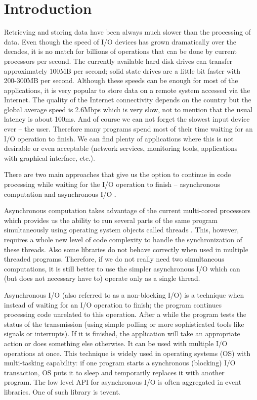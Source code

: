 \chapter{Introduction}

Retrieving and storing data have been always much slower than the processing of
data. Even though the speed of I/O devices has grown dramatically over the
decades, it is no match for billions of operations that can be done by current
processors per second. The currently available hard disk drives can transfer
approximately 100MB per second; solid state drives are a little bit faster with
200-300MB per second. Although these speeds can be enough for most of the
applications, it is very popular to store data on a remote system accessed via
the Internet. The quality of the Internet connectivity depends on the country
but the global average speed is 2.6Mbps \cite{StateOfTheInternet} which is very
slow, not to mention that the usual latency is about 100ms. And of course we
can not forget the slowest input device ever – the user. Therefore many programs
spend most of their time waiting for an I/O operation to finish. We can find
plenty of applications where this is not desirable or even acceptable (network
services, monitoring tools, applications with graphical interface, etc.).

There are two main approaches that give us the option to continue in code
processing while waiting for the I/O operation to finish – asynchronous
computation \cite{ParallelComputing} and asynchronous I/O \cite{AsynchronousIO}.

Asynchronous computation takes advantage of the current multi-cored processors
which provides us the ability to run several parts of the same program
simultaneously using operating system objects called threads \cite{Threads}.
This, however, requires a whole new level of code complexity to handle the
synchronization of these threads. Also some libraries do not behave correctly
when used in multiple threaded programs. Therefore, if we do not really need two
simultaneous computations, it is still better to use the simpler asynchronous
I/O which can (but does not necessary have to) operate only as a single thread.

Asynchronous I/O (also referred to as a non-blocking I/O) is a technique
when instead of waiting for an I/O operation to finish; the program continues
processing code unrelated to this operation. After a while the program tests
the status of the transmission (using simple polling or more sophisticated tools
like signals or interrupts). If it is finished, the application will take
an appropriate action or does something else otherwise. It can be used with
multiple I/O operations at once. This technique is widely used in operating
systems (OS) with multi-tasking capability: if one program starts a synchronous
(blocking) I/O transaction, OS puts it to sleep and temporarily replaces it
with another program. The low level API for asynchronous I/O is often aggregated
in event libraries. One of such library is tevent.

